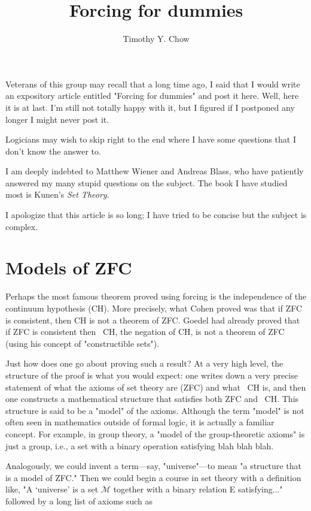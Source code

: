 \documentclass[10pt]{article}
\title{Forcing for dummies}
\author{Timothy Y. Chow}
\date{}
\theoremstyle{definition}
\begin{document}
\maketitle


Veterans of this group may recall that a long time ago, I said that I would
write an expository article entitled "Forcing for dummies" and post it here.
Well, here it is at last.  I'm still not totally happy with it, but I
figured if I postponed any longer I might never post it.

Logicians may wish to skip right to the end where I have some questions that
I don't know the answer to.

I am deeply indebted to Matthew Wiener and Andreas Blass, who have patiently
answered my many stupid questions on the subject.  The book I have studied
most is Kunen's \textit{Set Theory}.

I apologize that this article is so long; I have tried to be concise but the
subject is complex.


\section{Models of ZFC}

Perhaps the most famous theorem proved using forcing is the independence of
the continuum hypothesis (CH).  More precisely, what Cohen proved was that
if ZFC is consistent, then CH is not a theorem of ZFC.  Goedel had already
proved that if ZFC is consistent then ~CH, the negation of CH, is not a
theorem of ZFC (using his concept of "constructible sets").

Just how does one go about proving such a result?  At a very high level, the
structure of the proof is what you would expect: one writes down a very
precise statement of what the axioms of set theory are (ZFC) and what ~CH
is, and then one constructs a mathematical structure that satisfies both ZFC
and ~CH.  This structure is said to be a "model" of the axioms.  Although
the term "model" is not often seen in mathematics outside of formal logic,
it is actually a familiar concept.  For example, in group theory, a "model
of the group-theoretic axioms" is just a group, i.e., a set with a binary
operation satisfying blah blah blah.

Analogously, we could invent a term---say, "universe"---to mean "a structure
that is a model of ZFC."  Then we could begin a course in set theory with a
definition like, "A `universe' is a set $\mathcal{M}$ together with a binary relation E
satisfying..." followed by a long list of axioms such as
\end{document}
